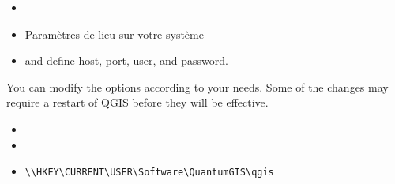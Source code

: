 %


\begin{itemize}
\item {}
\item Param\`etres de lieu sur votre syst\`eme 
\end{itemize}

%
%
%


\begin{itemize}
\item {} and define host, port, user, and password.
\end{itemize}

You can modify the options according to your needs. Some of the changes may 
require a restart of QGIS before they will be effective.

\begin{itemize}
\item {}
\item {}
\item {}
\begin{verbatim}
\\HKEY\CURRENT\USER\Software\QuantumGIS\qgis
\end{verbatim}
\end{itemize}

